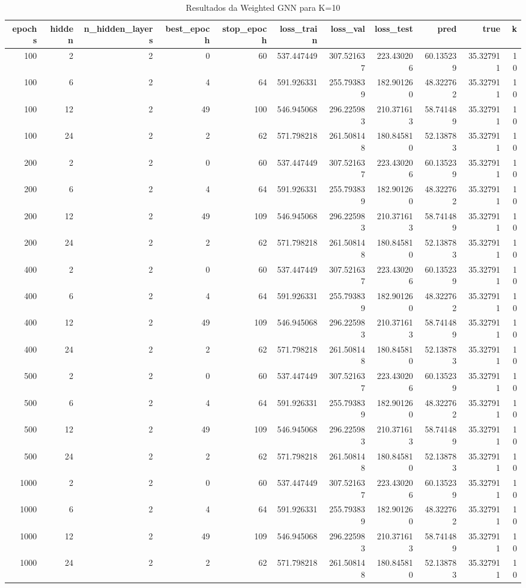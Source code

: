 \begin{table}
\caption{Resultados da Weighted GNN para K=10}
\label{tab:weighted_gnn_results_k10}
\begin{tabular}{rrrrrrrrrrr}
\toprule
epochs & hidden & n\_hidden\_layers & best\_epoch & stop\_epoch & loss\_train & loss\_val & loss\_test & pred & true & k \\
\midrule
100 & 2 & 2 & 0 & 60 & 537.447449 & 307.521637 & 223.430206 & 60.135239 & 35.327911 & 10 \\
100 & 6 & 2 & 4 & 64 & 591.926331 & 255.793839 & 182.901260 & 48.322762 & 35.327911 & 10 \\
100 & 12 & 2 & 49 & 100 & 546.945068 & 296.225983 & 210.371613 & 58.741489 & 35.327911 & 10 \\
100 & 24 & 2 & 2 & 62 & 571.798218 & 261.508148 & 180.845810 & 52.138783 & 35.327911 & 10 \\
200 & 2 & 2 & 0 & 60 & 537.447449 & 307.521637 & 223.430206 & 60.135239 & 35.327911 & 10 \\
200 & 6 & 2 & 4 & 64 & 591.926331 & 255.793839 & 182.901260 & 48.322762 & 35.327911 & 10 \\
200 & 12 & 2 & 49 & 109 & 546.945068 & 296.225983 & 210.371613 & 58.741489 & 35.327911 & 10 \\
200 & 24 & 2 & 2 & 62 & 571.798218 & 261.508148 & 180.845810 & 52.138783 & 35.327911 & 10 \\
400 & 2 & 2 & 0 & 60 & 537.447449 & 307.521637 & 223.430206 & 60.135239 & 35.327911 & 10 \\
400 & 6 & 2 & 4 & 64 & 591.926331 & 255.793839 & 182.901260 & 48.322762 & 35.327911 & 10 \\
400 & 12 & 2 & 49 & 109 & 546.945068 & 296.225983 & 210.371613 & 58.741489 & 35.327911 & 10 \\
400 & 24 & 2 & 2 & 62 & 571.798218 & 261.508148 & 180.845810 & 52.138783 & 35.327911 & 10 \\
500 & 2 & 2 & 0 & 60 & 537.447449 & 307.521637 & 223.430206 & 60.135239 & 35.327911 & 10 \\
500 & 6 & 2 & 4 & 64 & 591.926331 & 255.793839 & 182.901260 & 48.322762 & 35.327911 & 10 \\
500 & 12 & 2 & 49 & 109 & 546.945068 & 296.225983 & 210.371613 & 58.741489 & 35.327911 & 10 \\
500 & 24 & 2 & 2 & 62 & 571.798218 & 261.508148 & 180.845810 & 52.138783 & 35.327911 & 10 \\
1000 & 2 & 2 & 0 & 60 & 537.447449 & 307.521637 & 223.430206 & 60.135239 & 35.327911 & 10 \\
1000 & 6 & 2 & 4 & 64 & 591.926331 & 255.793839 & 182.901260 & 48.322762 & 35.327911 & 10 \\
1000 & 12 & 2 & 49 & 109 & 546.945068 & 296.225983 & 210.371613 & 58.741489 & 35.327911 & 10 \\
1000 & 24 & 2 & 2 & 62 & 571.798218 & 261.508148 & 180.845810 & 52.138783 & 35.327911 & 10 \\
\bottomrule
\end{tabular}
\end{table}
